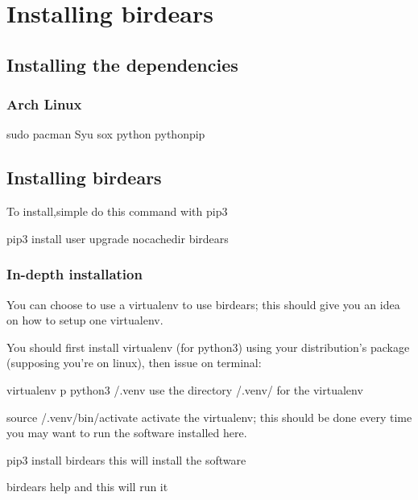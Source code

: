 \documentclass[letterpaper,10pt,english]{sphinxmanual}
\begin{document}
\chapter{Installing birdears}
\label{\detokenize{installing:installing-birdears}}\label{\detokenize{installing::doc}}

\section{Installing the dependencies}
\label{\detokenize{installing:installing-the-dependencies}}

\subsection{Arch Linux}
\label{\detokenize{installing:arch-linux}}
\begin{sphinxVerbatim}[commandchars=\\\{\}]
sudo pacman \PYGZhy{}Syu sox python python\PYGZhy{}pip
\end{sphinxVerbatim}


\section{Installing birdears}
\label{\detokenize{installing:id1}}
To install,simple do this command with pip3

\begin{sphinxVerbatim}[commandchars=\\\{\}]
pip3 install \PYGZhy{}\PYGZhy{}user \PYGZhy{}\PYGZhy{}upgrade \PYGZhy{}\PYGZhy{}no\PYGZhy{}cache\PYGZhy{}dir birdears
\end{sphinxVerbatim}


\subsection{In-depth installation}
\label{\detokenize{installing:in-depth-installation}}
You can choose to use a virtualenv to use birdears; this should give you
an idea on how to setup one virtualenv.

You should first install virtualenv (for python3) using your
distribution’s package (supposing you’re on linux), then issue on terminal:

\begin{sphinxVerbatim}[commandchars=\\\{\}]
virtualenv \PYGZhy{}p python3 \PYGZti{}/.venv \PYGZsh{} use the directory \PYGZti{}/.venv/ for the virtualenv

source \PYGZti{}/.venv/bin/activate   \PYGZsh{} activate the virtualenv; this should be done
                              \PYGZsh{} every time you may want to run the software
                              \PYGZsh{} installed here.

pip3 install birdears         \PYGZsh{} this will install the software

birdears \PYGZhy{}\PYGZhy{}help               \PYGZsh{} and this will run it
\end{sphinxVerbatim}
\end{document}

